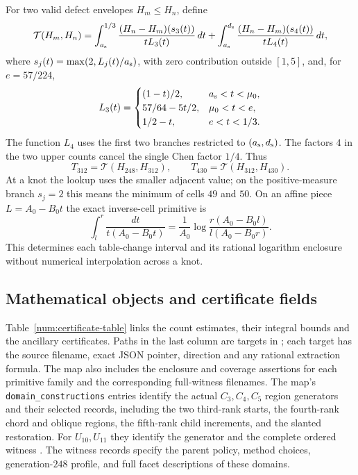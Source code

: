 For two valid defect envelopes $H_m\le H_n$, define
\begin{equation}
 \mathcal T(H_m,H_n)=
 \int_{a_{\rm s}}^{1/3}\frac{(H_n-H_m)(s_3(t))}{tL_3(t)}\,dt
 +\int_{a_{\rm s}}^{d_{\rm s}}\frac{(H_n-H_m)(s_4(t))}{tL_4(t)}\,dt,
 \label{num:table-change-integral}
\end{equation}
where $s_j(t)=\max(2,L_j(t)/{a_{\rm s}})$, with zero contribution outside
$[1,5]$, and, for $e=57/224$,
\[
 L_3(t)=\begin{cases}
 (1-t)/2,&{a_{\rm s}}<t<\mu_0,\\
 57/64-5t/2,&\mu_0<t<e,\\
 1/2-t,&e<t<1/3.
 \end{cases}
\]
The function $L_4$ uses the first two branches restricted to $({a_{\rm s}},{d_{\rm s}})$.
The factors $4$ in the two upper counts cancel the single Chen
factor $1/4$. Thus
\begin{equation}
 T_{312}=\mathcal T(H_{248},H_{312}),\qquad
 T_{430}=\mathcal T(H_{312},H_{430}).
 \label{num:successive-table-gains}
\end{equation}
At a knot the lookup uses the smaller adjacent value; on the
positive-measure branch $s_j=2$ this means the minimum of cells $49$
and $50$. On an affine piece $L=A_0-B_0t$ the exact inverse-cell
primitive is
\[
 \int_l^r\frac{dt}{t(A_0-B_0t)}
 =\frac1{A_0}\log\frac{r(A_0-B_0l)}{l(A_0-B_0r)}.
\]
This determines each table-change interval and its rational logarithm
enclosure without numerical interpolation across a knot.

\subsection{Mathematical objects and certificate fields}
\label{num:certificate-chain}
Table~\ref{num:certificate-table} links the count estimates, their
integral bounds and the ancillary certificates. Paths in the last
column are targets in ; each target has
the source filename, exact JSON pointer, direction and any rational
extraction formula. The map also includes
the enclosure and coverage assertions for each primitive family and
the corresponding full-witness filenames.
The map's \texttt{domain\_constructions} entries identify the actual
$C_3,C_4,C_5$ region generators and their selected records, including
the two third-rank starts, the fourth-rank chord and oblique regions,
the fifth-rank child increments, and the slanted restoration.
For $U_{10},U_{11}$ they identify the generator
 and the complete ordered witness
.
The witness records specify the parent policy, method choices,
generation-$248$ profile, and full facet descriptions of these domains.

